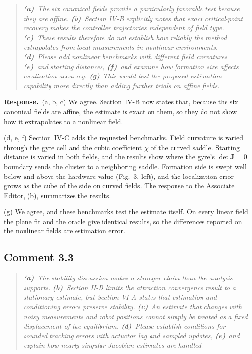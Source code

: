 \documentclass[10pt]{article}
\newcommand{\resp}{\par\textbf{Response.}~}
\begin{document}
\begin{quote}\itshape
\textbf{(a)}~The six canonical fields provide a particularly favorable test because they are affine.
\textbf{(b)}~Section IV-B explicitly notes that exact critical-point recovery makes the controller trajectories independent of field type.
\textbf{(c)}~These results therefore do not establish how reliably the method extrapolates from local measurements in nonlinear environments.
\textbf{(d)}~Please add nonlinear benchmarks with different field curvatures
\textbf{(e)}~and starting distances,
\textbf{(f)}~and examine how formation size affects localization accuracy.
\textbf{(g)}~This would test the proposed estimation capability more directly than adding further trials on affine fields.
\end{quote}


\resp (a, b, c) We agree. Section~IV-B now states that, because the six canonical fields are affine, the estimate is exact on them, so they do not show how it extrapolates to a nonlinear field.

(d, e, f) Section~IV-C adds the requested benchmarks. Field curvature is varied through the gyre cell and the cubic coefficient $\chi$ of the curved saddle. Starting distance is varied in both fields, and the results show where the gyre's $\det\mathbf{J} = 0$ boundary sends the cluster to a neighboring saddle. Formation side is swept well below and above the hardware value (Fig.~3, left), and the localization error grows as the cube of the side on curved fields. The response to the Associate Editor, (b), summarizes the results.

(g) We agree, and these benchmarks test the estimate itself. On every linear field the plane fit and the oracle give identical results, so the differences reported on the nonlinear fields are estimation error.

\subsection*{Comment 3.3}

\begin{quote}\itshape
\textbf{(a)}~The stability discussion makes a stronger claim than the analysis supports.
\textbf{(b)}~Section II-D limits the attraction convergence result to a stationary estimate, but Section VI-A states that estimation and conditioning errors preserve stability.
\textbf{(c)}~An estimate that changes with noisy measurements and robot positions cannot simply be treated as a fixed displacement of the equilibrium.
\textbf{(d)}~Please establish conditions for bounded tracking errors with actuator lag and sampled updates,
\textbf{(e)}~and explain how nearly singular Jacobian estimates are handled.
\end{quote}
\end{document}
